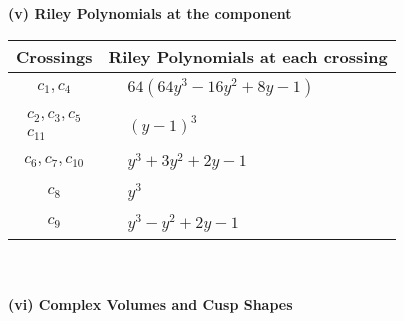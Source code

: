 \documentclass[1p]{elsarticle_modified}
\theoremstyle{definition}
\begin{document}
\newpage\renewcommand{\arraystretch}{1}
\flushleft \textbf{(v) Riley Polynomials at the component}\newline \\
\begin{tabular}{m{50pt}|m{274pt}}
Crossings & \hspace{64pt}Riley Polynomials at each crossing \\
\hline $$\begin{aligned}c_{1},c_{4}\end{aligned}$$&$\begin{aligned}
&64(64 y^3-16 y^2+8 y-1)
\end{aligned}$\\
\hline $$\begin{aligned}c_{2},c_{3},c_{5}\\c_{11}\end{aligned}$$&$\begin{aligned}
&(y-1)^3
\end{aligned}$\\
\hline $$\begin{aligned}c_{6},c_{7},c_{10}\end{aligned}$$&$\begin{aligned}
&y^3+3 y^2+2 y-1
\end{aligned}$\\
\hline $$\begin{aligned}c_{8}\end{aligned}$$&$\begin{aligned}
&y^3
\end{aligned}$\\
\hline $$\begin{aligned}c_{9}\end{aligned}$$&$\begin{aligned}
&y^3- y^2+2 y-1
\end{aligned}$\\
\hline
\end{tabular}\\~\\
\newpage\flushleft \textbf{(vi) Complex Volumes and Cusp Shapes}
\end{document}
